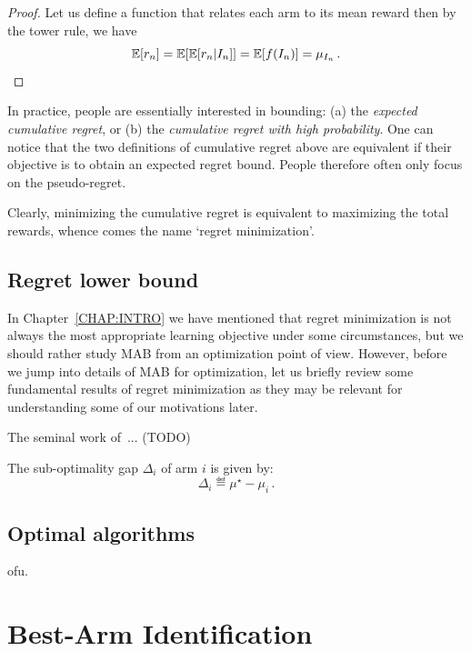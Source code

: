 \begin{proof}
	Let us define a function that relates each arm to its mean reward  then by the tower rule, we have
    \[
	    \mathbb{E}[r_n] = \mathbb{E}[\mathbb{E}[r_n|I_n]] = \mathbb{E}[f(I_n)] = \mu_{I_n}\,.
    \]
\end{proof}

In practice, people are essentially interested in bounding: (a) the \emph{expected cumulative regret}, or (b) the \emph{cumulative regret with high probability}. One can notice that the two definitions of cumulative regret above are equivalent if their objective is to obtain an expected regret bound. People therefore often only focus on the pseudo-regret.

Clearly, minimizing the cumulative regret is equivalent to maximizing the total rewards, whence comes the name `regret minimization'. 

\subsection{Regret lower bound}\label{sec:mab.model.lb}

In Chapter~\ref{CHAP:INTRO} we have mentioned that regret minimization is not always the most appropriate learning objective under some circumstances, but we should rather study MAB from an optimization point of view. However, before we jump into details of MAB for optimization, let us briefly review some fundamental results of regret minimization as they may be relevant for understanding some of our motivations later.

The seminal work of~\cite{robbins1952}... (TODO)

\begin{definition}\label{def:mab.gap}
\begin{leftbar}[defnbar]
The sub-optimality gap $\Delta_i$ of arm $i$ is given by:
\[
	\Delta_i \eqdef \mu^{\star} - \mu_i\,.
\]
\end{leftbar}
\end{definition}

\subsection{Optimal algorithms}\label{sec:mab.model.ucb}

\gls{ofu}.

\section{Best-Arm Identification}\label{sec:mab.bai}


